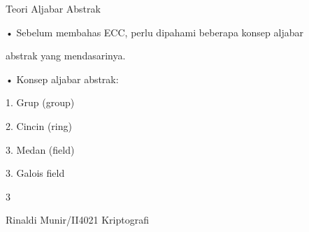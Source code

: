 \documentclass{article}
\begin{document}

Teori Aljabar Abstrak

• Sebelum membahas ECC, perlu dipahami beberapa konsep aljabar 

abstrak yang mendasarinya.

• Konsep aljabar abstrak:

 1. Grup (group)

 2. Cincin (ring)

 3. Medan (field)

 3. Galois field


3

Rinaldi Munir/II4021 Kriptografi
\end{document}
